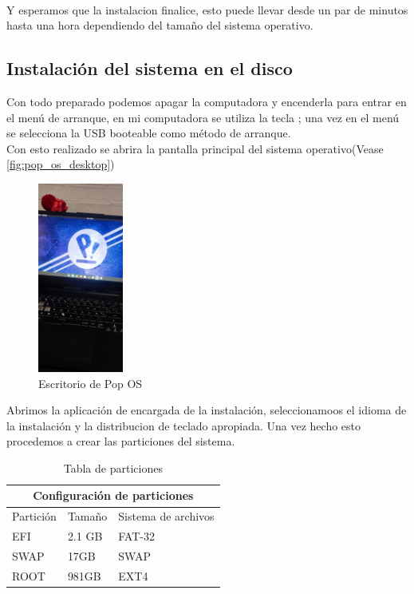 \\
Y esperamos que la instalacion finalice, esto puede llevar desde un par de minutos hasta una hora dependiendo del tamaño del sistema operativo.


\subsection{Instalación del sistema en el disco}

Con todo preparado podemos apagar la computadora y encenderla para entrar en el menú de arranque, en mi computadora se utiliza la tecla ; una vez en el menú se selecciona la USB booteable como método de arranque. 
\\
Con esto realizado se abrira la pantalla principal del sistema operativo(Vease \autoref{fig:pop_os_desktop})

\begin{figure}[h]
  \begin{center}
    \includegraphics[width=0.25\textwidth]{img/pop_os_desktop.jpeg}
  \end{center}
  \caption{Escritorio de Pop OS}\label{fig:pop_os_desktop}
\end{figure}

Abrimos la aplicación de encargada de la instalación, seleccionamoos el idioma de la instalación y la distribucion de teclado apropiada. 
Una vez hecho esto procedemos a crear las particiones del sistema.

\begin{table}[h]
  \centering
  \begin{tabular}{ |p{3cm}|p{3cm}|p{3cm}|  }
    \hline
    \multicolumn{3}{|c|}{Configuración de particiones} \\
    \hline
    Partición & Tamaño & Sistema de archivos\\
    \hline
    EFI & 2.1 GB & FAT-32\\
    SWAP & 17GB & SWAP\\
    ROOT & 981GB & EXT4\\
    \hline
  \end{tabular}
  \label{tab:particiones}
  \caption{Tabla de particiones}
\end{table}

